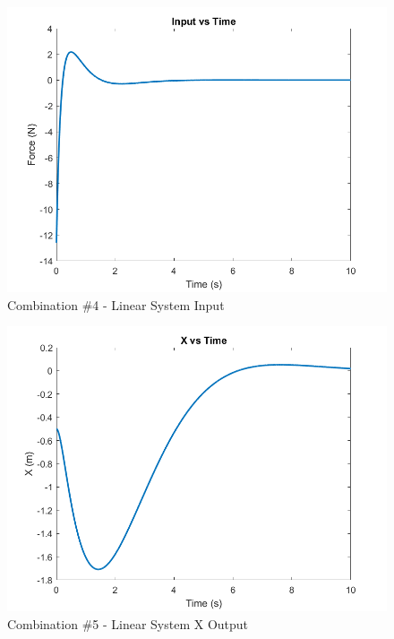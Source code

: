 \begin{figure}[!ht]
    \centering
    \includegraphics[width=\linewidth]{figs/sf_lin_input.png}
    \caption{Combination $\#$4 - Linear System Input}
    \label{}
\end{figure}

\begin{figure}[!ht]
    \centering
    \includegraphics[width=\linewidth]{figs/sf_lin_c5_x.png}
    \caption{Combination $\#$5 - Linear System X Output}
    \label{}
\end{figure}

